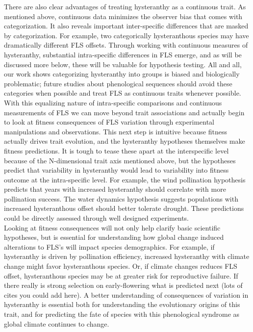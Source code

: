 \documentclass[12pt]{article}\usepackage[]{graphicx}\usepackage[]{color}
\begin{document}
\indent There are also clear advantages of treating hysteranthy as a continuous trait. As mentioned above, continuous data minimizes the observer bias that comes with categorization. It also reveals important inter-specific differences that are masked by categorization. For example, two categorically hysteranthous species may have dramatically different FLS offsets. Through working with continuous measures of hysteranthy, substantial intra-specific differences in FLS emerge, and as will be discussed more below, these will be valuable for hypothesis testing. All and all, our work shows categorizing hysteranthy into groups is biased and biologically problematic; future studies about phenological sequences should avoid these categories when possible and treat FLS as continuous traits whenever possible.\\
\indent With this equalizing nature of intra-specific comparisons and continuous measurements of FLS we can move beyond trait associations and actually begin to look at fitness consequences of FLS variation through experimental manipulations and observations. This next step is intuitive because fitness actually drives trait evolution, and the hysteranthy hypotheses themselves make fitness predictions. It is tough to tease these apart at the interspecific level because of the N-dimensional trait axis mentioned above, but the hypotheses predict that variability in hysteranthy would lead to variability into fitness outcome at the intra-specific level. For example, the wind pollination hypothesis predicts that years with increased hysteranthy should correlate with more pollination success. The water dynamics hypothesis suggests populations with increased hysteranthous offset should better tolerate drought. These predictions could be directly assessed through well designed experiments.\\
\indent Looking at fitness consequences will not only help clarify basic scientific hypotheses, but is essential for understanding how global change induced alterations to FLS's will impact species demographics. For example, if hysteranthy is driven by pollination efficiency, increased hysteranthy with climate change might favor hysteranthous species. Or, if climate changes reduces FLS offset, hysteranthous species may be at greater risk for reproductive failure. If there really is strong selection on early-flowering what is predicted next (lots of cites you could add here). %
A better understanding of consequences of variation in hysteranthy is essential both for understanding the evolutionary origins of this trait, and for predicting the fate of species with this phenological syndrome as global climate continues to change.
\end{document}
